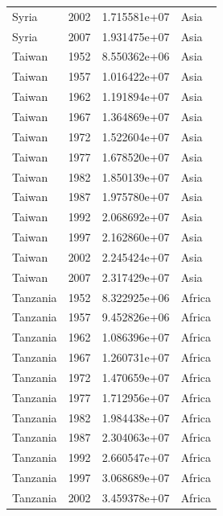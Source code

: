 \documentclass[
  letterpaper,
  DIV=11,
  numbers=noendperiod]{scrreprt}
\begin{document}
\begin{tcolorbox}
\begin{tabular}{lrrl}
Syria                    &  2002 &  1.715581e+07 &      Asia \\
Syria                    &  2007 &  1.931475e+07 &      Asia \\
Taiwan                   &  1952 &  8.550362e+06 &      Asia \\
Taiwan                   &  1957 &  1.016422e+07 &      Asia \\
Taiwan                   &  1962 &  1.191894e+07 &      Asia \\
Taiwan                   &  1967 &  1.364869e+07 &      Asia \\
Taiwan                   &  1972 &  1.522604e+07 &      Asia \\
Taiwan                   &  1977 &  1.678520e+07 &      Asia \\
Taiwan                   &  1982 &  1.850139e+07 &      Asia \\
Taiwan                   &  1987 &  1.975780e+07 &      Asia \\
Taiwan                   &  1992 &  2.068692e+07 &      Asia \\
Taiwan                   &  1997 &  2.162860e+07 &      Asia \\
Taiwan                   &  2002 &  2.245424e+07 &      Asia \\
Taiwan                   &  2007 &  2.317429e+07 &      Asia \\
Tanzania                 &  1952 &  8.322925e+06 &    Africa \\
Tanzania                 &  1957 &  9.452826e+06 &    Africa \\
Tanzania                 &  1962 &  1.086396e+07 &    Africa \\
Tanzania                 &  1967 &  1.260731e+07 &    Africa \\
Tanzania                 &  1972 &  1.470659e+07 &    Africa \\
Tanzania                 &  1977 &  1.712956e+07 &    Africa \\
Tanzania                 &  1982 &  1.984438e+07 &    Africa \\
Tanzania                 &  1987 &  2.304063e+07 &    Africa \\
Tanzania                 &  1992 &  2.660547e+07 &    Africa \\
Tanzania                 &  1997 &  3.068689e+07 &    Africa \\
Tanzania                 &  2002 &  3.459378e+07 &    Africa \\

\end{tabular}
\end{tcolorbox}
\end{document}
